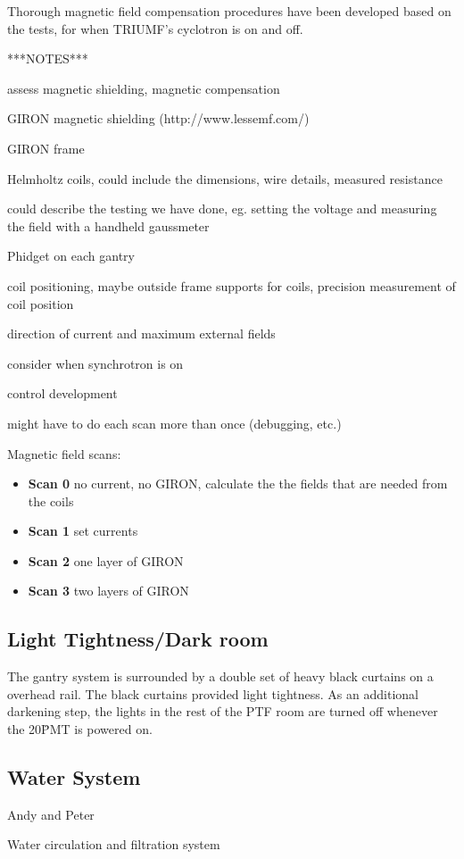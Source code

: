 Thorough magnetic field compensation procedures have been developed based on the tests, for when TRIUMF's cyclotron is on and off.


***NOTES***

assess magnetic shielding, magnetic compensation

GIRON magnetic shielding (http://www.lessemf.com/)

GIRON frame

Helmholtz coils, could include the dimensions, wire details,
measured resistance

could describe the testing we have done, eg. setting the voltage and
measuring the field with a handheld gaussmeter

Phidget on each gantry


coil positioning, maybe outside frame supports for coils, precision measurement of coil position

direction of current and maximum external fields

consider when synchrotron is on

control development

might have to do each scan more than once (debugging, etc.)

Magnetic field scans:
\begin{itemize}
\item{\bf Scan 0} no current, no GIRON, calculate the the fields that are needed from the coils
\item{\bf Scan 1} set currents
\item{\bf Scan 2} one layer of GIRON
\item{\bf Scan 3} two layers of GIRON
\end{itemize}


\subsection{Light Tightness/Dark room}

The gantry system is surrounded by a double set of heavy black
curtains on a overhead rail.  The black curtains provided light tightness.
As an additional darkening step, the lights in the rest of the PTF room
are turned off whenever the 20\" PMT is powered on.


\subsection{Water System}
Andy and Peter

Water circulation and filtration system


